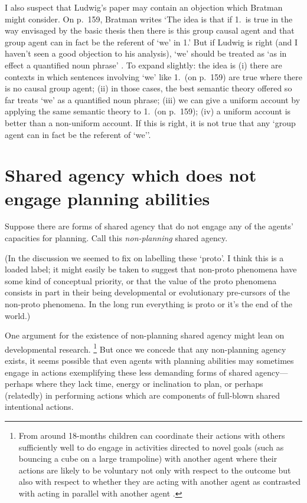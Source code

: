 \documentclass[12pt,letterpaper]{extarticle}
\begin{document}
I also suspect that Ludwig's paper may contain an objection which Bratman might consider.
On p.\ 159, Bratman writes `The idea is that if 1.\ is true in the way envisaged by the basic thesis then there is this group causal agent and that group agent can in fact be the referent of `we' in 1.'
But if Ludwig is right (and I haven't seen a good objection to his analysis), `we' should be treated as `as in effect a quantified noun phrase' \citep[p.\ 364]{ludwig_collective_2007}.
To expand slightly: the idea is (i) there are contexts in which sentences involving `we' like 1.\ (on p.\ 159) are true where there is no causal group agent; (ii) in those cases, the best semantic theory offered so far treats `we' as a quantified noun phrase; (iii) we can give a uniform account by applying the same semantic theory to 1.\ (on p.\ 159); (iv) a uniform account is better than a non-uniform account.
If this is right, it is not true that any `group agent can in fact be the referent of `we''.



\section{Shared agency which does not engage planning abilities}

Suppose there are forms of shared agency that do not engage any of the agents' capacities for planning.  
Call this \emph{non-planning} shared agency.

(In the discussion we seemed to fix on labelling these `proto'.
I think this is a loaded label; it might easily be taken to suggest that non-proto phenomena have some kind of conceptual priority, or that the value of the proto phenomena consists in part in their being developmental or evolutionary pre-cursors of the non-proto phenomena.
In the long run everything is proto or it's the end of the world.)

One argument for the existence of non-planning shared agency might lean on developmental research.%
%
\footnote{
From around 18-months children can coordinate their actions with others sufficiently well to do engage in activities directed to novel goals (such as bouncing a cube on a large trampoline) with another agent \citep[e.g.][]{Warneken:2006qe} where their actions are likely to be voluntary not only with respect to the outcome but also with respect to whether they are acting with another agent as contrasted with acting in parallel with another agent \citep{Grafenhain:2010zl}.
} 
%
But once we concede that any non-planning agency exists, it seems possible that even agents with planning abilities may sometimes engage in actions exemplifying these less demanding forms of shared agency---perhaps where they lack time, energy or inclination to plan, or perhaps (relatedly) in performing actions which are components of full-blown shared intentional actions.
\end{document}
